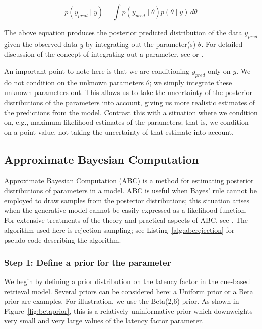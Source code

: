 \documentclass{cambridge7A}\usepackage[]{graphicx}\usepackage[]{color}
\begin{document}
\begin{equation}
p(y_{pred}\mid y) = \int p(y_{pred} \mid \theta) p(\theta \mid y)\, d\theta
\end{equation}

The above equation produces the posterior predicted distribution of the data $y_{pred}$ given the observed data $y$ by integrating out the parameter(s) $\theta$. For detailed discussion of the concept of integrating out a parameter, see \cite{lunn2012bugs} or \cite{NicenboimEtAlBayes2019}.

An important point to note here is that we are conditioning $y_{pred}$ only on $y$. We do not condition on the unknown parameters $\theta$; we simply integrate these unknown parameters out. This allows us to take the uncertainty of the posterior distributions of the parameters into account, giving us more realistic estimates of the predictions from the model. Contrast this with a situation where we condition on, e.g.,  maximum likelihood estimates of the parameters; that is,  we condition on a point value, not taking the uncertainty of that estimate into account.

\subsection{Approximate Bayesian Computation}

 
Approximate Bayesian Computation (ABC) \citep{SissonABC} is a method for estimating posterior distributions of parameters in a model. ABC is useful when Bayes' rule cannot be employed to draw samples from the posterior distributions; this situation arises when the generative model cannot be easily expressed as a likelihood function. For extensive treatments of the theory and practical aspects of ABC, see \cite{SissonABC,palestro2018likelihood}.  The algorithm used here is  rejection sampling; see Listing~\ref{alg:abcrejection} for pseudo-code describing the algorithm.

\subsubsection{Step 1: Define a prior for the parameter}

We begin by defining a prior distribution on the latency factor in the cue-based retrieval model. Several priors can be considered here: a Uniform prior or a Beta prior are examples. For illustration, we use the Beta(2,6) prior. As shown in Figure~\ref{fig:betaprior}, this is a relatively uninformative prior which downweights very small and very large values of the latency factor parameter.
\end{document}
